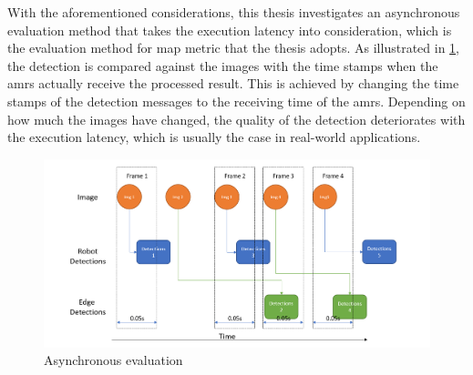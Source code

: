 With the aforementioned considerations, this thesis investigates an asynchronous evaluation method that takes the execution latency into consideration, which is the evaluation method for \gls{map} metric that the thesis adopts. As illustrated in \cref{fig:async_eval}, the detection is compared against the images with the time stamps when the \glspl{amr} actually receive the processed result. This is achieved by changing the time stamps of the detection messages to the receiving time of the \glspl{amr}. Depending on how much the images have changed, the quality of the detection deteriorates with the execution latency, which is usually the case in real-world applications.

\begin{figure}[htp]
    \centering
    \includegraphics[width=\linewidth]{figures/setup/async_eval.png}
    \caption{Asynchronous evaluation}
    \label{fig:async_eval}
\end{figure}
